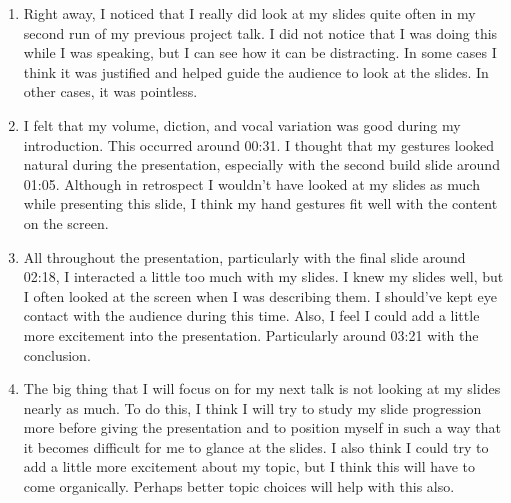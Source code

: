 \documentclass{article}
\begin{document}
\begin{enumerate}[1.]
  \item Right away, I noticed that I really did look at my slides quite often in
    my second run of my previous project talk. I did not notice that I was doing
    this while I was speaking, but I can see how it can be distracting. In some
    cases I think it was justified and helped guide the audience to look at the
    slides. In other cases, it was pointless.
  \item I felt that my volume, diction, and vocal variation was good during my
    introduction. This occurred around 00:31. I thought that my gestures looked
    natural during the presentation, especially with the second build slide
    around 01:05. Although in retrospect I wouldn't have looked at my slides as
    much while presenting this slide, I think my hand gestures fit well with the
    content on the screen.
  \item All throughout the presentation, particularly with the final slide
    around 02:18, I interacted a little too much with my slides. I knew my
    slides well, but I often looked at the screen when I was describing them. I
    should've kept eye contact with the audience during this time. Also, I feel
    I could add a little more excitement into the presentation. Particularly
    around 03:21 with the conclusion.
  \item The big thing that I will focus on for my next talk is not looking at my
    slides nearly as much. To do this, I think I will try to study my slide
    progression more before giving the presentation and to position myself in
    such a way that it becomes difficult for me to glance at the slides. I also
    think I could try to add a little more excitement about my topic, but I
    think this will have to come organically. Perhaps better topic choices will
    help with this also.
\end{enumerate}
\end{document}
